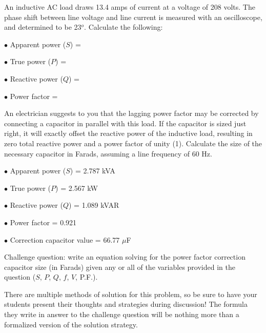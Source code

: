 

An inductive AC load draws 13.4 amps of current at a voltage of 208 volts.  The phase shift between line voltage and line current is measured with an oscilloscope, and determined to be 23$^{o}$.  Calculate the following:

\medskip
\goodbreak
\item{$\bullet$} Apparent power ($S$) =
\item{$\bullet$} True power ($P$) =
\item{$\bullet$} Reactive power ($Q$) =
\item{$\bullet$} Power factor =
\medskip

An electrician suggests to you that the lagging power factor may be corrected by connecting a capacitor in parallel with this load.  If the capacitor is sized just right, it will exactly offset the reactive power of the inductive load, resulting in zero total reactive power and a power factor of unity (1).  Calculate the size of the necessary capacitor in Farads, assuming a line frequency of 60 Hz.







\medskip
\goodbreak
\item{$\bullet$} Apparent power ($S$) = 2.787 kVA
\item{$\bullet$} True power ($P$) = 2.567 kW
\item{$\bullet$} Reactive power ($Q$) = 1.089 kVAR
\item{$\bullet$} Power factor = 0.921
\item{$\bullet$} Correction capacitor value = 66.77 $\mu$F
\medskip

\vskip 10pt

Challenge question: write an equation solving for the power factor correction capacitor size (in Farads) given any or all of the variables provided in the question ($S$, $P$, $Q$, $f$, $V$, P.F.).







There are multiple methods of solution for this problem, so be sure to have your students present their thoughts and strategies during discussion!  The formula they write in answer to the challenge question will be nothing more than a formalized version of the solution strategy.




